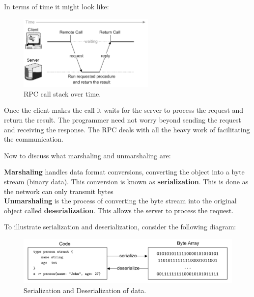 \noindent
In terms of time it might look like:

\begin{figure}[h]
    \centering
    \includegraphics[width=0.6\textwidth]{Sections/rpc/call_time.png}
    \caption{RPC call stack over time.}
    \label{fig:rpc_time}
\end{figure}

\noindent 
Once the client makes the call it waits for the server to process the request and return the result. The programmer need not worry beyond sending the request and receiving the response.
The RPC deals with all the heavy work of facilitating the communication.

\newpage 

\noindent
Now to discuss what marshaling and unmarshaling are:
\begin{Def}

    \textbf{Marshaling} handles data format conversions, converting the object into a byte stream (binary data).
    This conversion is known as \textbf{serialization}. This is done as the network can only transmit bytes\\
    
    \noindent
    \textbf{Unmarshaling} is the process of converting the byte stream into the original object called \textbf{deserialization}. 
    This allows the server to process the request.
\end{Def}

\noindent
To illustrate serialization and deserialization, consider the following diagram:
\begin{figure}[h]
    \centering
    \includegraphics[width=1\textwidth]{Sections/rpc/ser.png}
    \caption{Serialization and Deserialization of data.}
    \label{fig:ser_deser}
\end{figure}

